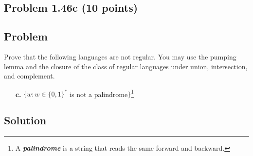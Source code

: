\documentclass{article}
\begin{document}
\begin{empfile}
%
%
%
%


\section*{Problem 1.46c (10 points)}

\subsection*{Problem}

Prove that the following languages are not regular. You may use the
pumping lemma and the closure of the class of regular languages
under union, intersection, and complement.

\begin{enumerate}
\item[\bfseries c.] $\{w:w\in\{0,1\}^*$ is not a
palindrome$\}$\footnote{A \textit{\textbf{palindrome}} is a string
that reads the same forward and backward.}
\end{enumerate}

\subsection*{Solution}

\end{empfile}
\immediate{}
\end{document}
